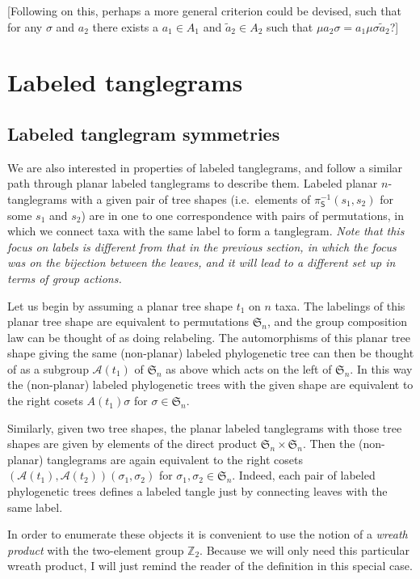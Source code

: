 \documentclass{amsart}
\newcommand{\ZZ}{\mathbb Z}
\newcommand{\fS}{\mathfrak S}
\newcommand{\aut}{\mathcal A}
\newcommand{\pairing}{\mu}
\newcommand{\shape}{\mathsf{S}}
\begin{document}
[Following on this, perhaps a more general criterion could be devised, such that for any $\sigma$ and $a_2$ there exists a $a_1 \in A_1$ and $\tilde a_2 \in A_2$ such that $\pairing a_2 \sigma = a_1 \pairing \sigma \tilde a_2$?]


\section{Labeled tanglegrams}
\subsection{Labeled tanglegram symmetries}
We are also interested in properties of labeled tanglegrams, and follow a similar path through planar labeled tanglegrams to describe them.
Labeled planar $n$-tanglegrams with a given pair of tree shapes (i.e.\ elements of $\pi_\shape^{-1}(s_1, s_2)$ for some $s_1$ and $s_2$) are in one to one correspondence with pairs of permutations, in which we connect taxa with the same label to form a tanglegram.
\emph{Note that this focus on labels is different from that in the previous section, in which the focus was on the bijection between the leaves, and it will lead to a different set up in terms of group actions.}

Let us begin by assuming a planar tree shape $t_1$ on $n$ taxa.
The labelings of this planar tree shape are equivalent to permutations $\fS_n$, and the group composition law can be thought of as doing relabeling.
The automorphisms of this planar tree shape giving the same (non-planar) labeled phylogenetic tree can then be thought of as a subgroup $\aut(t_1)$ of $\fS_n$ as above which acts on the left of $\fS_n$.
In this way the (non-planar) labeled phylogenetic trees with the given shape are equivalent to the right cosets $A(t_1) \sigma$ for $\sigma \in \fS_n$.

Similarly, given two tree shapes, the planar labeled tanglegrams with those tree shapes are given by elements of the direct product $\fS_n \times \fS_n$.
Then the (non-planar) tanglegrams are again equivalent to the right cosets $(\aut(t_1), \aut(t_2)) (\sigma_1, \sigma_2)$ for $\sigma_1, \sigma_2 \in \fS_n$.
Indeed, each pair of labeled phylogenetic trees defines a labeled tangle just by connecting leaves with the same label.

In order to enumerate these objects it is convenient to use the notion of a \emph{wreath product} with the two-element group $\ZZ_2$.
Because we will only need this particular wreath product, I will just remind the reader of the definition in this special case.
\end{document}
